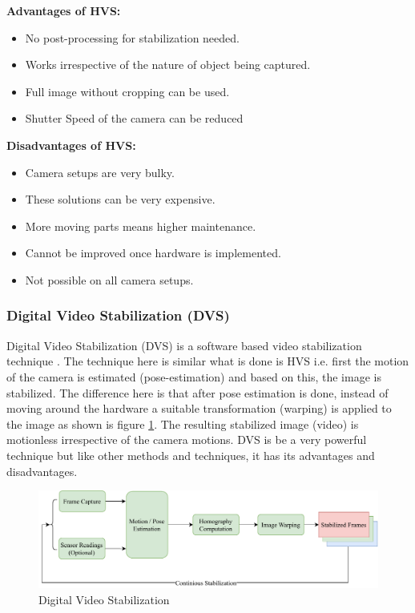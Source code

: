 \textbf{Advantages of HVS: }

\begin{itemize}
\item No post-processing for stabilization needed.
\item Works irrespective of the nature of object being captured.
\item Full image without cropping can be used.
\item Shutter Speed of the camera can be reduced
\end{itemize}

\textbf{Disadvantages of HVS:}
\begin{itemize}
\item Camera setups are very bulky.
\item These solutions can be very expensive.
\item More moving parts means higher maintenance.
\item Cannot be improved once hardware is implemented.
\item Not possible on all camera setups.
\end{itemize}

\subsubsection{Digital Video Stabilization (DVS)}
Digital Video Stabilization (DVS) is a software based video stabilization technique \citep{dis_review}. The technique here is similar what is done is HVS i.e. first the motion of the camera is estimated (pose-estimation) and based on this, the image is stabilized. The difference here is that after pose estimation is done, instead of moving around the hardware a suitable transformation (warping) is applied to the image \citep{dis_feat_track} as shown is figure \ref{fig:dis}. The resulting stabilized image (video) is motionless irrespective of the camera motions. DVS is be a very powerful technique but like other methods and techniques, it has its advantages and disadvantages.

\begin{figure}[H]
\centering
\includegraphics[scale=0.6]{images/fig_chapter2/2_1_dis.pdf}
\caption{Digital Video Stabilization}
\label{fig:dis}
\end{figure}


